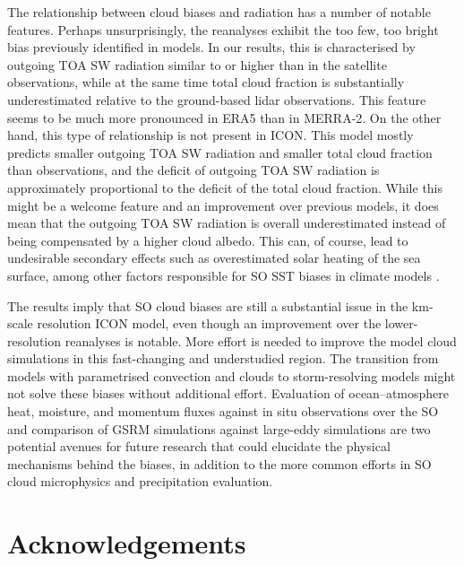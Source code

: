 \documentclass[12pt,a4paper]{article}
\begin{document}
The relationship between cloud biases and radiation has a number of notable
features. Perhaps unsurprisingly, the reanalyses exhibit the too few, too
bright bias previously identified in models. In our results, this is
characterised by outgoing TOA SW radiation similar to or higher than in the
satellite observations, while at the same time total cloud fraction is
substantially underestimated relative to the ground-based lidar observations.
This feature seems to be much more pronounced in ERA5 than in MERRA-2. On the
other hand, this type of relationship is not present in ICON. This model mostly
predicts smaller outgoing TOA SW radiation and smaller total cloud fraction
than observations, and the deficit of outgoing TOA SW radiation is
approximately proportional to the deficit of the total cloud fraction. While this
might be a welcome feature and an improvement over previous models, it does
mean that the outgoing TOA SW radiation is overall underestimated instead of
being compensated by a higher cloud albedo. This can, of course, lead to
undesirable secondary effects such as overestimated solar heating of the sea
surface, among other factors responsible for SO SST biases in climate models
\citep{zhang2023,luo2023}.

The results imply that SO cloud biases are still a substantial issue in the
km-scale resolution ICON model, even though an improvement over the
lower-resolution reanalyses is notable. More effort is needed to improve the
model cloud simulations in this fast-changing and understudied region. The
transition from models with parametrised convection and clouds to
storm-resolving models might not solve these biases without additional effort.
Evaluation of ocean--atmosphere heat, moisture, and momentum fluxes against in
situ observations over the SO and comparison of GSRM simulations against
large-eddy simulations are two potential avenues for future research that could
elucidate the physical mechanisms behind the biases, in addition to the more
common efforts in SO cloud microphysics and precipitation evaluation.

\fontsize{12pt}{14pt}\selectfont
\section*{Acknowledgements}
\end{document}
